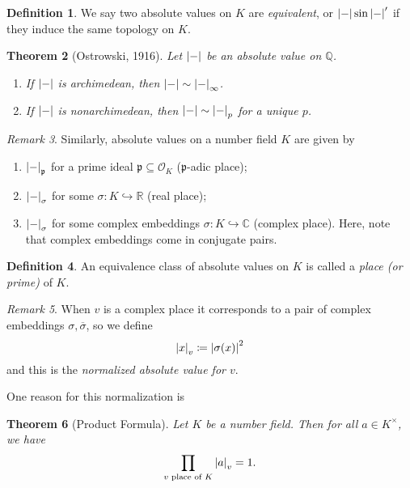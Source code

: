 \documentclass[leqno, openany]{memoir}
\newtheorem{thm}{Theorem}[section]
\theoremstyle{definition}
\newtheorem{defn}[thm]{Definition}
\theoremstyle{remark}
\newtheorem{rmk}[thm]{Remark}
\theoremstyle{plain}
\theoremstyle{definition}
\theoremstyle{remark}
\newcommand{\R}{\mathbb{R}}
\newcommand{\C}{\mathbb{C}}
\newcommand{\Q}{\mathbb{Q}}
\newcommand{\mc}[1]{\mathcal{#1}}
\newcommand{\mf}[1]{\mathfrak{#1}}
\newcommand{\ol}[1]{\overline{#1}}
\begin{document}
\begin{defn} We say two absolute values on $K$ are \textit{equivalent}, or
$\abs{-} \sin \abs{-}'$ if they induce the same topology on $K$.  \end{defn}

\begin{thm}[Ostrowski, 1916] Let $\abs{-}$ be an absolute value on $\Q$.
    \begin{enumerate} \item If $\abs{-}$ is archimedean, then $\abs{-} \sim
        \abs{-}_{\infty}$.  \item If $\abs{-}$ is nonarchimedean, then $\abs{-}
        \sim \abs{-}_p$ for a unique $p$.  \end{enumerate} \end{thm}

\begin{rmk} Similarly, absolute values on a number field $K$ are given by
    \begin{enumerate} \item $\abs{-}_{\mf{p}}$ for a prime ideal $\mf{p}
        \subseteq \mc{O}_K$ ($\mf{p}$-adic place); \item $\abs{-}_{\sigma}$ for
        some $\sigma \colon K \hookrightarrow \R$ (real place); \item
$\abs{-}_{\sigma}$ for some complex embeddings $\sigma \colon K \hookrightarrow
\C$ (complex place). Here, note that complex embeddings come in conjugate
pairs.  \end{enumerate} \end{rmk}

\begin{defn} An equivalence class of absolute values on $K$ is called a
\textit{place (or prime)} of $K$.  \end{defn}

\begin{rmk} When $v$ is a complex place it corresponds to a pair of complex
    embeddings $\sigma, \ol{\sigma}$, so we define \[ \abs{x}_v \coloneqq
    \abs{\sigma(x)}^2 \] and this is the \textit{normalized absolute value for
$v$}.  \end{rmk}

One reason for this normalization is

\begin{thm}[Product Formula] Let $K$ be a number field. Then for all $a \in
    K^{\times}$, we have \[ \prod_{v \text{ place of }K} \abs{a}_v = 1. \]
\end{thm}
\end{document}
